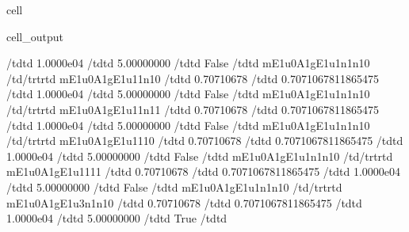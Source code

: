 \documentclass[letterpaper,table,10pt,english]{jupyterBook}
\begin{document}
\begin{sphinxuseclass}{cell}
\begin{sphinxVerbatimOutput}
\begin{sphinxuseclass}{cell_output}
\begin{sphinxVerbatim}[commandchars=\\\{\}]
\PYGZlt{}/td\PYGZgt{}\PYGZlt{}td\PYGZgt{}  1.0000e\PYGZhy{}04 \PYGZlt{}/td\PYGZgt{}\PYGZlt{}td\PYGZgt{}  5.00000000 \PYGZlt{}/td\PYGZgt{}\PYGZlt{}td\PYGZgt{} False \PYGZlt{}/td\PYGZgt{}\PYGZlt{}td\PYGZgt{} m\PYGZus{}E1u\PYGZus{}0\PYGZus{}A1g\PYGZus{}E1u\PYGZus{}1\PYGZus{}n1\PYGZus{}n1\PYGZus{}0 \PYGZlt{}/td\PYGZgt{}\PYGZlt{}/tr\PYGZgt{}\PYGZlt{}tr\PYGZgt{}\PYGZlt{}td\PYGZgt{} m\PYGZus{}E1u\PYGZus{}0\PYGZus{}A1g\PYGZus{}E1u\PYGZus{}1\PYGZus{}1\PYGZus{}n1\PYGZus{}0 \PYGZlt{}/td\PYGZgt{}\PYGZlt{}td\PYGZgt{}  0.70710678 \PYGZlt{}/td\PYGZgt{}\PYGZlt{}td\PYGZgt{} 0.7071067811865475 \PYGZlt{}/td\PYGZgt{}\PYGZlt{}td\PYGZgt{}  1.0000e\PYGZhy{}04 \PYGZlt{}/td\PYGZgt{}\PYGZlt{}td\PYGZgt{}  5.00000000 \PYGZlt{}/td\PYGZgt{}\PYGZlt{}td\PYGZgt{} False \PYGZlt{}/td\PYGZgt{}\PYGZlt{}td\PYGZgt{} m\PYGZus{}E1u\PYGZus{}0\PYGZus{}A1g\PYGZus{}E1u\PYGZus{}1\PYGZus{}n1\PYGZus{}n1\PYGZus{}0 \PYGZlt{}/td\PYGZgt{}\PYGZlt{}/tr\PYGZgt{}\PYGZlt{}tr\PYGZgt{}\PYGZlt{}td\PYGZgt{} m\PYGZus{}E1u\PYGZus{}0\PYGZus{}A1g\PYGZus{}E1u\PYGZus{}1\PYGZus{}1\PYGZus{}n1\PYGZus{}1 \PYGZlt{}/td\PYGZgt{}\PYGZlt{}td\PYGZgt{}  0.70710678 \PYGZlt{}/td\PYGZgt{}\PYGZlt{}td\PYGZgt{} 0.7071067811865475 \PYGZlt{}/td\PYGZgt{}\PYGZlt{}td\PYGZgt{}  1.0000e\PYGZhy{}04 \PYGZlt{}/td\PYGZgt{}\PYGZlt{}td\PYGZgt{}  5.00000000 \PYGZlt{}/td\PYGZgt{}\PYGZlt{}td\PYGZgt{} False \PYGZlt{}/td\PYGZgt{}\PYGZlt{}td\PYGZgt{} m\PYGZus{}E1u\PYGZus{}0\PYGZus{}A1g\PYGZus{}E1u\PYGZus{}1\PYGZus{}n1\PYGZus{}n1\PYGZus{}0 \PYGZlt{}/td\PYGZgt{}\PYGZlt{}/tr\PYGZgt{}\PYGZlt{}tr\PYGZgt{}\PYGZlt{}td\PYGZgt{} m\PYGZus{}E1u\PYGZus{}0\PYGZus{}A1g\PYGZus{}E1u\PYGZus{}1\PYGZus{}1\PYGZus{}1\PYGZus{}0 \PYGZlt{}/td\PYGZgt{}\PYGZlt{}td\PYGZgt{}  0.70710678 \PYGZlt{}/td\PYGZgt{}\PYGZlt{}td\PYGZgt{} 0.7071067811865475 \PYGZlt{}/td\PYGZgt{}\PYGZlt{}td\PYGZgt{}  1.0000e\PYGZhy{}04 \PYGZlt{}/td\PYGZgt{}\PYGZlt{}td\PYGZgt{}  5.00000000 \PYGZlt{}/td\PYGZgt{}\PYGZlt{}td\PYGZgt{} False \PYGZlt{}/td\PYGZgt{}\PYGZlt{}td\PYGZgt{} m\PYGZus{}E1u\PYGZus{}0\PYGZus{}A1g\PYGZus{}E1u\PYGZus{}1\PYGZus{}n1\PYGZus{}n1\PYGZus{}0 \PYGZlt{}/td\PYGZgt{}\PYGZlt{}/tr\PYGZgt{}\PYGZlt{}tr\PYGZgt{}\PYGZlt{}td\PYGZgt{} m\PYGZus{}E1u\PYGZus{}0\PYGZus{}A1g\PYGZus{}E1u\PYGZus{}1\PYGZus{}1\PYGZus{}1\PYGZus{}1 \PYGZlt{}/td\PYGZgt{}\PYGZlt{}td\PYGZgt{}  0.70710678 \PYGZlt{}/td\PYGZgt{}\PYGZlt{}td\PYGZgt{} 0.7071067811865475 \PYGZlt{}/td\PYGZgt{}\PYGZlt{}td\PYGZgt{}  1.0000e\PYGZhy{}04 \PYGZlt{}/td\PYGZgt{}\PYGZlt{}td\PYGZgt{}  5.00000000 \PYGZlt{}/td\PYGZgt{}\PYGZlt{}td\PYGZgt{} False \PYGZlt{}/td\PYGZgt{}\PYGZlt{}td\PYGZgt{} m\PYGZus{}E1u\PYGZus{}0\PYGZus{}A1g\PYGZus{}E1u\PYGZus{}1\PYGZus{}n1\PYGZus{}n1\PYGZus{}0 \PYGZlt{}/td\PYGZgt{}\PYGZlt{}/tr\PYGZgt{}\PYGZlt{}tr\PYGZgt{}\PYGZlt{}td\PYGZgt{} m\PYGZus{}E1u\PYGZus{}0\PYGZus{}A1g\PYGZus{}E1u\PYGZus{}3\PYGZus{}n1\PYGZus{}n1\PYGZus{}0 \PYGZlt{}/td\PYGZgt{}\PYGZlt{}td\PYGZgt{}  0.70710678 \PYGZlt{}/td\PYGZgt{}\PYGZlt{}td\PYGZgt{} 0.7071067811865475 \PYGZlt{}/td\PYGZgt{}\PYGZlt{}td\PYGZgt{}  1.0000e\PYGZhy{}04 \PYGZlt{}/td\PYGZgt{}\PYGZlt{}td\PYGZgt{}  5.00000000 \PYGZlt{}/td\PYGZgt{}\PYGZlt{}td\PYGZgt{} True \PYGZlt{}/td\PYGZgt{}\PYGZlt{}td\PYGZgt{}  
\end{sphinxVerbatim}
\end{sphinxuseclass}
\end{sphinxVerbatimOutput}
\end{sphinxuseclass}
\end{document}
